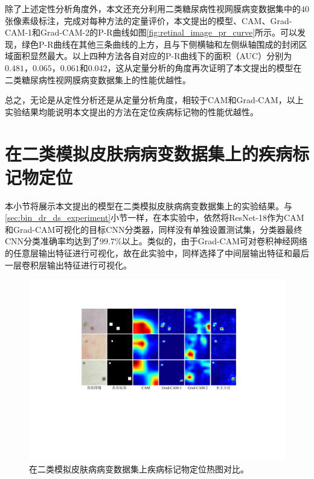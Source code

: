 除了上述定性分析角度外，本文还充分利用二类糖尿病性视网膜病变数据集中的$40$张像素级标注，完成对每种方法的定量评价，本文提出的模型、CAM、Grad-CAM-1和Grad-CAM-2的P-R曲线如图\ref{fig:retinal_image_pr_curve}所示。可以发现，绿色P-R曲线在其他三条曲线的上方，且与下侧横轴和左侧纵轴围成的封闭区域面积显然最大。以上四种方法各自对应的P-R曲线下的面积（AUC）分别为$0.481$，$0.065$，$0.061$和$0.042$，这从定量分析的角度再次证明了本文提出的模型在二类糖尿病性视网膜病变数据集上的性能优越性。

总之，无论是从定性分析还是从定量分析角度，相较于CAM和Grad-CAM，以上实验结果均能说明本文提出的方法在定位疾病标记物的性能优越性。
\section{在二类模拟皮肤病病变数据集上的疾病标记物定位}\label{sec:bin_simulated_ds_experiment}
本小节将展示本文提出的模型在二类模拟皮肤病病变数据集上的实验结果。与\ref{sec:bin_dr_ds_experiment}小节一样，在本实验中，依然将ResNet-18作为CAM和Grad-CAM可视化的目标CNN分类器，同样没有单独设置测试集，分类器最终CNN分类准确率均达到了$99.7\%$以上。类似的，由于Grad-CAM可对卷积神经网络的任意层输出特征进行可视化，故在此实验中，同样选择了中间层输出特征和最后一层卷积层输出特征进行可视化。
\begin{figure}[h]
	\centering
	\includegraphics[width=1.0\textwidth]{figure/pr_curve_skin_image.pdf}
	\caption[在二类模拟皮肤病病变数据集上疾病标记物定位热图对比]{在二类模拟皮肤病病变数据集上疾病标记物定位热图对比。} 
	\label{fig:simulated_skin}
\end{figure}


